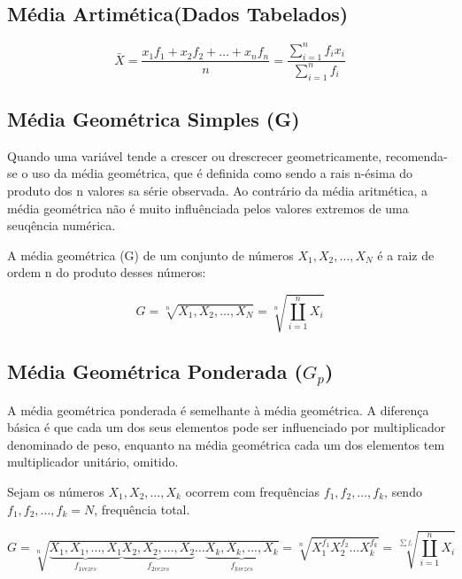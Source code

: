 \subsection{Média Artimética(Dados Tabelados)}


\begin{equation}\label{media2}
     \bar{X}= \frac{x_{1}f_{1}+x_{2}f_{2}+\ldots+x_{n}f_{n}}{n} = \frac{\sum_{i=1}^{n}f_{i}x_{i}}{\sum_{i=1}^{n}f_{i}}
\end{equation}





\subsection{Média Geométrica Simples (G)}

Quando uma variável tende a crescer ou drescrecer geometricamente, recomenda-se o uso da média geométrica, que é definida como sendo a rais n-ésima do produto dos n valores sa série observada. Ao contrário da média aritmética, a média geométrica não é muito influênciada pelos valores extremos de uma seuqência numérica.\vskip0.3cm


A média geométrica (G) de um conjunto de números $X_{1},X_{2},\ldots,X_{N}$ é a raiz de ordem n do produto
desses números:

\begin{equation}\label{Geometrica}
    G=\sqrt[n]{X_{1},X_{2},\ldots,X_{N}}=\sqrt[n]{\coprod_{i=1}^{n}X_{i}}
\end{equation}


\subsection{Média Geométrica Ponderada ($G_{p}$)}

A média geométrica ponderada é semelhante à média geométrica. A diferença básica é que cada um dos seus elementos pode ser influenciado por multiplicador denominado de peso, enquanto na média geométrica cada um dos elementos tem multiplicador unitário, omitido.\vskip0.3cm


Sejam os números $X_{1},X_{2},\ldots,X_{k}$ ocorrem com frequências $f_{1},f_{2},\ldots,f_{k}$, sendo $f_{1},f_{2},\ldots,f_{k}=N$, frequência total.


\begin{equation}\label{Geometrica}
    G=\sqrt[n]{\underbrace{X_{1},X_{1},...,X_{1}}_{f_{1vezes}}\underbrace{X_{2},X_{2},...,X_{2}}_{f_{2vezes}} \ldots \underbrace{X_{k},X_{k},...,X_{k}}_{f_{kvezes}}}=\sqrt[n]{X_{1}^{f_{1}}X_{2}^{f_{2}}\ldots X_{k}^{f_{k}}}
 = \sqrt[\sum f_{i}]{\coprod_{i=1}^{n}X_{i}}
\end{equation}

